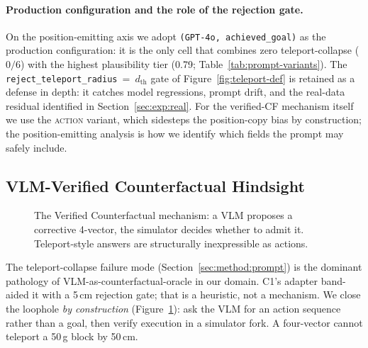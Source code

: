 \documentclass{article}
\begin{document}
\paragraph{Production configuration and the role of the rejection gate.}
On the position-emitting axis we adopt \texttt{(GPT-4o,
achieved\_goal)} as the production configuration: it is the only cell
that combines zero teleport-collapse ($0/6$) with the highest
plausibility tier (0.79; Table~\ref{tab:prompt-variants}). The
\texttt{reject\_teleport\_radius}~=~$d_{\text{th}}$ gate of
Figure~\ref{fig:teleport-def} is retained as a defense in depth: it
catches model regressions, prompt drift, and the real-data residual
identified in Section~\ref{sec:exp:real}. For the verified-CF mechanism
itself we use the \textsc{action} variant, which sidesteps the
position-copy bias by construction; the position-emitting analysis is
how we identify which fields the prompt may safely include.

\subsection{VLM-Verified Counterfactual Hindsight}
\label{sec:method:verified}

\begin{figure}[t]
\centering
{}
\caption{The Verified Counterfactual mechanism: a VLM proposes a corrective
4-vector, the simulator decides whether to admit it. Teleport-style answers are
structurally inexpressible as actions.}
\label{fig:protocol}
\end{figure}

The teleport-collapse failure mode (Section~\ref{sec:method:prompt}) is the
dominant pathology of VLM-as-counterfactual-oracle in our domain. C1's adapter
band-aided it with a 5\,cm rejection gate; that is a heuristic, not a
mechanism. We close the loophole \emph{by construction} (Figure~\ref{fig:protocol}):
ask the VLM for an action sequence rather than a goal, then verify execution in
a simulator fork. A four-vector cannot teleport a 50\,g block by 50\,cm.
\end{document}
